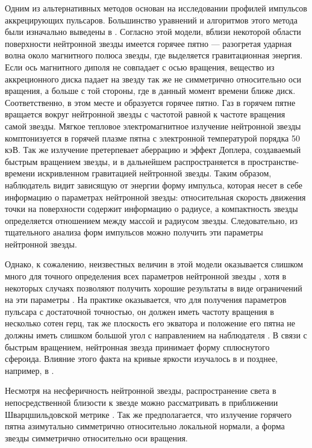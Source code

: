 \documentclass[14pt,a4paper]{extarticle}
\begin{document}
		Одним из альтернативных методов основан на исследовании профилей импульсов аккрецирующих пульсаров. 
		Большинство уравнений и алгоритмов этого метода были изначально выведены в \cite{Poutanen2003}. 
		Согласно этой модели, вблизи некоторой области поверхности нейтронной звезды имеется горячее пятно --- разогретая ударная волна около магнитного полюса звезды, где выделяется гравитационная энергия.
		Если ось магнитного диполя не совпадает с осью вращения, вещество из аккреционного диска падает на звезду так же не симметрично относительно оси вращения, а больше с той стороны, где в данный момент времени ближе диск. 
		Соответственно, в этом месте и образуется горячее пятно.
		Газ в горячем пятне вращается вокруг нейтронной звезды с частотой равной к частоте вращения самой звезды.
		Мягкое тепловое электромагнитное излучение нейтронной звезды комптонизуется в горячей плазме пятна с электронной температурой порядка 50 кэВ.
		Так же излучение претерпевает аберрацию и эффект Доплера,  создаваемый быстрым вращением звезды, и в дальнейшем распространяется в пространстве-времени искривленном гравитацией нейтронной звезды.  
		Таким образом, наблюдатель видит зависящую от энергии форму импульса, которая несет в себе информацию о параметрах нейтронной звезды:
		относительная скорость движения точки на поверхности содержит информацию о радиусе, а компактность звезды определяется отношением между массой и радиусом звезды. 
		Следовательно, из тщательного анализа форм импульсов можно получить эти параметры нейтронной звезды.

		Однако, к сожалению, неизвестных величин в этой модели оказывается слишком много для точного определения всех параметров нейтронной звезды \cite{Poutanen2008}, хотя в некоторых случаях позволяют получить хорошие результаты в виде ограничений на эти параметры \cite{Leahy2007}.
		На практике оказывается, что для получения параметров пульсара с достаточной точностью, он должен иметь частоту вращения в несколько сотен герц, так же плоскость его экватора и положение его пятна не должны иметь слишком большой угол с направлением на наблюдателя \cite{Miller2016}.
		В связи с быстрым вращением, нейтронная звезда принимает форму сплюснутого сфероида. 
		Влияние этого факта на кривые яркости изучалось в \cite{Cadeau2007} и позднее, например, в \cite{Leahy2006}. 

		Несмотря на несферичность нейтронной звезды, распространение света в непосредственной близости к звезде можно рассматривать в приближении Шварцшильдовской метрике \cite{Morsink2007}. 
		Так же предполагается, что излучение горячего пятна азимутально симметрично относительно локальной нормали, а форма звезды симметрично относительно оси вращения. 
\end{document}
